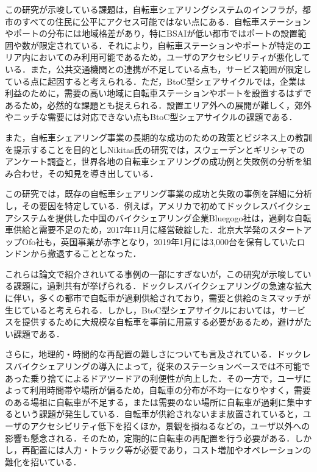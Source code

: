           \par この研究が示唆している課題は，自転車シェアリングシステムのインフラが，都市のすべての住民に公平にアクセス可能ではない点にある．自転車ステーションやポートの分布には地域格差があり，特にBSAIが低い都市ではポートの設置範囲や数が限定されている．それにより，自転車ステーションやポートが特定のエリア内においてのみ利用可能であるため，ユーザのアクセシビリティが悪化している．また，公共交通機関との連携が不足している点も，サービス範囲が限定している点に起因すると考えられる．ただ，BtoC型シェアサイクルでは，企業は利益のために，需要の高い地域に自転車ステーションやポートを設置するはずであるため，必然的な課題とも捉えられる．設置エリア外への展開が難しく，郊外やニッチな需要には対応できない点もBtoC型シェアサイクルの課題である．
          \par また，自転車シェアリング事業の長期的な成功のための政策とビジネス上の教訓を提示することを目的としNikitas氏の研究では，スウェーデンとギリシャでのアンケート調査と，世界各地の自転車シェアリングの成功例と失敗例の分析を組み合わせ，その知見を導き出している．
          \par この研究では，既存の自転車シェアリング事業の成功と失敗の事例を詳細に分析し，その要因を特定している．例えば，アメリカで初めてドックレスバイクシェアシステムを提供した中国のバイクシェアリング企業Bluegogo社は，過剰な自転車供給と需要不足のため，2017年11月に経営破綻した．北京大学発のスタートアップOfo社も，英国事業が赤字となり，2019年1月には3,000台を保有していたロンドンから撤退することとなった．
          \par これらは論文で紹介されいてる事例の一部にすぎないが，この研究が示唆している課題に，過剰共有が挙げられる．ドックレスバイクシェアリングの急速な拡大に伴い，多くの都市で自転車が過剰供給されており，需要と供給のミスマッチが生じていると考えられる．しかし，BtoC型シェアサイクルにおいては，サービスを提供するために大規模な自転車を事前に用意する必要があるため，避けがたい課題である．
          \par さらに，地理的・時間的な再配置の難しさについても言及されている．ドックレスバイクシェアリングの導入によって，従来のステーションベースでは不可能であった乗り捨てによるドアツードアの利便性が向上した．その一方で，ユーザによって利用時間帯や場所が偏るため，自転車の分布が不均一になりやすく，需要のある場祖に自転車が不足する，または需要のない場所に自転車が過剰に集中するという課題が発生している．自転車が供給されないまま放置されていると，ユーザのアクセシビリティ低下を招くほか，景観を損ねるなどの，ユーザ以外への影響も懸念される．そのため，定期的に自転車の再配置を行う必要がある．しかし，再配置には人力・トラック等が必要であり，コスト増加やオペレーションの難化を招いている．


